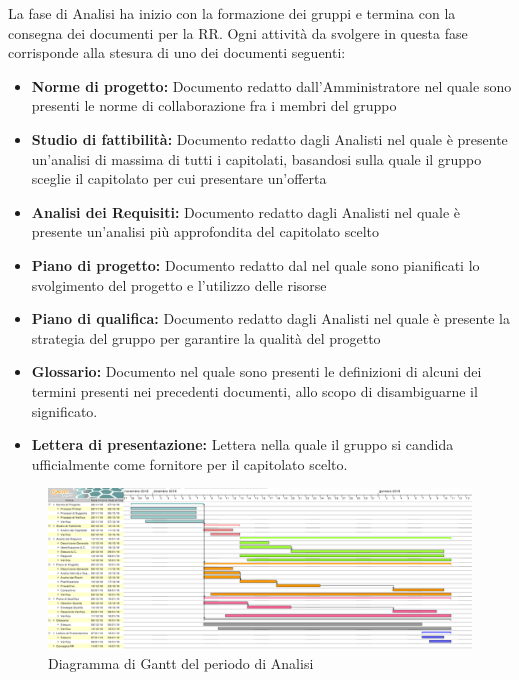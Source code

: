 La fase di Analisi ha inizio con la formazione dei gruppi e termina con la consegna dei documenti per la RR. \newline
Ogni attività da svolgere in questa fase corrisponde alla stesura di uno dei documenti seguenti: 
\begin{itemize}
	\item \textbf{Norme di progetto: }
	Documento redatto dall'Amministratore nel quale sono presenti le norme di 					collaborazione fra i membri del gruppo \gruppo
	\item \textbf{Studio di fattibilità: }
	Documento redatto dagli Analisti nel quale è presente un'analisi di massima di tutti 	i capitolati, basandosi sulla quale il gruppo sceglie il capitolato per cui presentare un'offerta
	\item \textbf{Analisi dei Requisiti: }
	Documento redatto dagli Analisti nel quale è presente un'analisi più approfondita del capitolato scelto
	\item \textbf{Piano di progetto: }
	Documento redatto dal \Res nel quale sono pianificati lo svolgimento del progetto e l'utilizzo delle risorse
	\item \textbf{Piano di qualifica: }
	Documento redatto dagli Analisti nel quale è presente la strategia del gruppo \gruppo \space per garantire la qualità del progetto
	\item \textbf{Glossario: }
	Documento nel quale sono presenti le definizioni di alcuni dei termini presenti nei precedenti documenti, allo scopo di disambiguarne il significato.
	\item \textbf{Lettera di presentazione: }
	Lettera nella quale il gruppo \gruppo \space si candida ufficialmente come fornitore per il capitolato scelto.
\end{itemize}

\begin{figure}[H]
	\includegraphics[width=1\linewidth]{Pianificazione/Analisi_Gantt.png}
	\caption{Diagramma di Gantt del periodo di Analisi}
\end{figure}
